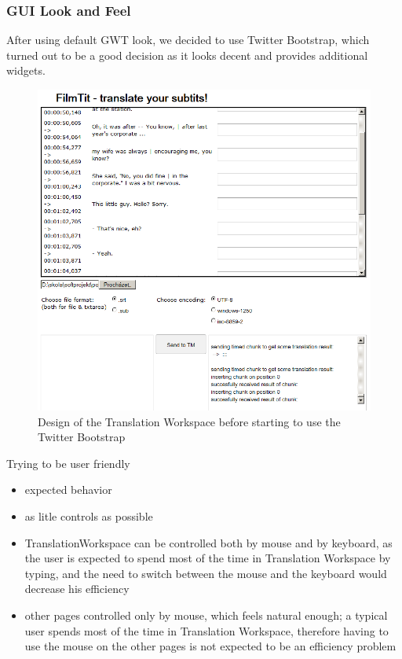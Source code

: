 \subsubsection{GUI Look and Feel}

After using default GWT look, we decided to use Twitter Bootstrap, which turned out to be a good decision as it looks decent and provides additional widgets.

\begin{figure}
\begin{center}
\includegraphics[scale=0.5]{figures/old_screenshot.png}
\end{center}
\caption{Design of the Translation Workspace before starting to use the Twitter Bootstrap}
\label{fig:before_bootstrap}
\end{figure}

Trying to be user friendly

\begin{itemize}
\item expected behavior
\item as litle controls as possible
\item TranslationWorkspace can be controlled both by mouse and by keyboard, as the user is expected to spend most of the time in Translation Workspace by typing, and the need to switch between the mouse and the keyboard would decrease his efficiency
\item other pages controlled only by mouse, which feels natural enough; a typical user spends most of the time in Translation Workspace, therefore having to use the mouse on the other pages is not expected to be an efficiency problem
\end{itemize}


